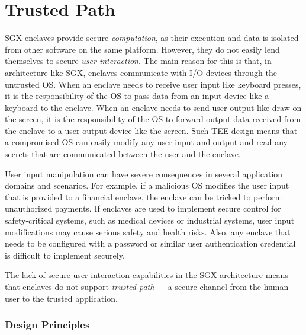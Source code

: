 
\section*{Trusted Path}

SGX enclaves provide secure \emph{computation}, as their execution and data is isolated from other software on the same platform. However, they do not easily lend themselves to secure \emph{user interaction}. The main reason for this is that, in architecture like SGX, enclaves communicate with I/O devices through the untrusted OS. When an enclave needs to receive user input like keyboard presses, it is the responsibility of the OS to pass data from an input device like a keyboard to the enclave. When an enclave needs to send user output like draw on the screen, it is the responsibility of the OS to forward output data received from the enclave to a user output device like the screen. Such TEE design means that a compromised OS can easily modify any user input and output and read any secrets that are communicated between the user and the enclave. 

User input manipulation can have severe consequences in several application domains and scenarios. For example, if a malicious OS modifies the user input that is provided to a financial enclave, the enclave can be tricked to perform unauthorized payments. If enclaves are used to implement secure control for safety-critical systems, such as medical devices or industrial systems, user input modifications may cause serious safety and health risks. Also, any enclave that needs to be configured with a password or similar user authentication credential is difficult to implement securely.

The lack of secure user interaction capabilities in the SGX architecture means that enclaves do not support \emph{trusted path} --- a secure channel from the human user to the trusted application. 



\subsubsection*{Design Principles}

